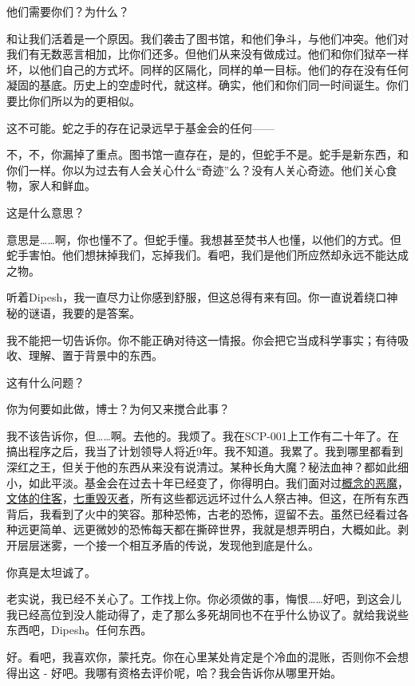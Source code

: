 \begin{scpbox}
他们需要你们？为什么？

和让我们活着是一个原因。我们袭击了图书馆，和他们争斗，与他们冲突。他们对我们有无数恶言相加，比你们还多。但他们从来没有做成过。他们和你们狱卒一样坏，以他们自己的方式坏。同样的区隔化，同样的单一目标。他们的存在没有任何凝固的基底。历史上的空虚时代，就这样。确实，他们和你们同一时间诞生。你们要比你们所以为的更相似。

这不可能。蛇之手的存在记录远早于基金会的任何——

不，不，你漏掉了重点。图书馆一直存在，是的，但蛇手不是。蛇手是新东西，和你们一样。你以为过去有人会关心什么“奇迹”么？没有人关心奇迹。他们关心食物，家人和鲜血。

这是什么意思？

意思是……啊，你也懂不了。但蛇手懂。我想甚至焚书人也懂，以他们的方式。但蛇手害怕。他们想抹掉我们，忘掉我们。看吧，我们是他们所应然却永远不能达成之物。

听着Dipesh，我一直尽力让你感到舒服，但这总得有来有回。你一直说着绕口神秘的谜语，我要的是答案。

我不能把一切告诉你。你不能正确对待这一情报。你会把它当成科学事实；有待吸收、理解、置于背景中的东西。

这有什么问题？

你为何要如此做，博士？为何又来搅合此事？

我不该告诉你，但……啊。去他的。我烦了。我在SCP-001上工作有二十年了。在搞出程序之后，我当了计划领导人将近9年。我不知道。我累了。我到哪里都看到深红之王，但关于他的东西从来没有说清过。某种长角大魔？秘法血神？都如此细小，如此平淡。基金会在过去十年已经变了，你得明白。我们面对过\hyperref[chap:SCP-3125]{概念的恶魔}，\hyperref[chap:SCP-3043]{文体的住客}，\hyperref[chap:SCP-2747]{七重毁灭者}，所有这些都远远坏过什么人祭古神。但这，在所有东西背后，我看到了火中的笑容。那种恐怖，古老的恐怖，逗留不去。虽然已经看过各种远更简单、远更微妙的恐怖每天都在撕碎世界，我就是想弄明白，大概如此。剥开层层迷雾，一个接一个相互矛盾的传说，发现他到底是什么。

你真是太坦诚了。

老实说，我已经不关心了。工作找上你。你必须做的事，悔恨……好吧，到这会儿我已经高位到没人能动得了，走了那么多死胡同也不在乎什么协议了。就给我说些东西吧，Dipesh。任何东西。

好。看吧，我喜欢你，蒙托克。你在心里某处肯定是个冷血的混账，否则你不会想得出这 - 好吧。我哪有资格去评价呢，哈？我会告诉你从哪里开始。


\end{scpbox}
